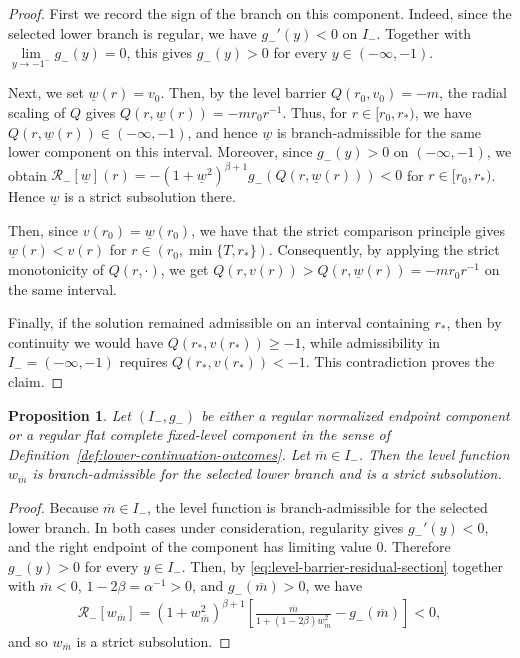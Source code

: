 \documentclass{amsart}
\theoremstyle{plain}
\newtheorem{proposition}[theorem]{Proposition}
\theoremstyle{mainintrothm}
\theoremstyle{definition}
\begin{document}
\begin{proof}
	First we record the sign of the branch on this component.  Indeed, since the selected
	lower branch is regular, we have $g_-'(y)<0$ on $I_-$.  Together with
	$\lim\limits_{y\to-1^-}g_-(y)=0$, this gives
	$g_-(y)>0$ for every $y\in(-\infty,-1)$.
	
	\medskip
	
	Next, we set $\underline w(r)=v_0$.  Then, by the level barrier $Q(r_0,v_0)=-m$, the radial scaling of
	$Q$ gives $Q(r,\underline w(r))=-mr_0r^{-1}$. Thus, for $r\in[r_0,r_*)$, we have
	$Q(r,\underline w(r))\in(-\infty,-1)$, and hence $\underline w$ is
	branch-admissible for the same lower component on this interval.  Moreover,
	since $g_-(y)>0$ on $(-\infty,-1)$, we obtain $\mathcal R_-[\underline w](r)=-(1+\underline w^2)^{\beta+1}g_-(Q(r,\underline w(r)))<0$ for $r\in[r_0,r_*)$.  Hence $\underline w$ is a strict subsolution there.
	
	\medskip
	
	Then, since  $v(r_0)=\underline w(r_0)$, we have that  the strict comparison principle gives $\underline w(r)<v(r)$ for $r\in(r_0,\min\{T,r_*\})$. Consequently, by applying the strict monotonicity of $Q(r,\cdot)$, we get
   $Q(r,v(r))>Q(r,\underline w(r))=-mr_0r^{-1}$ on the same interval.
	
	\medskip
	
	Finally, if the solution remained admissible on an interval containing
	$r_*$, then by continuity we would have $Q(r_*,v(r_*))\geq-1$, while admissibility in $I_-=(-\infty,-1)$ requires
	$Q(r_*,v(r_*))<-1$.  This contradiction proves the claim.
\end{proof}

\begin{proposition}
	\label{prop:level-barriers-signed}
	Let $(I_-,g_-)$ be either a regular normalized endpoint component or a
	regular flat complete fixed-level component in the sense of
	Definition~\ref{def:lower-continuation-outcomes}.  Let
	$\overline m\in I_-$.  Then the level function $w_{\overline m}$ is
	branch-admissible for the selected lower branch and is a strict subsolution.
\end{proposition}

\begin{proof}
	Because $\overline m\in I_-$, the level function is branch-admissible for the
	selected lower branch.  In both cases under consideration, regularity gives
	$g_-'(y)<0$, and the right endpoint of the component has limiting value
	$0$.  Therefore $g_-(y)>0$ for every $y\in I_-$.  Then, by
	\eqref{eq:level-barrier-residual-section} together with $\overline m<0$, $1-2\beta=\alpha^{-1}>0$, and
	$g_-(\overline m)>0$, we have
	\begin{align*}
		\mathcal R_-[w_{\overline m}]
		=
		(1+w_{\overline m}^2)^{\beta+1}
		\left[
		\frac{\overline m}
		{1+(1-2\beta)w_{\overline m}^2}
		-
		g_-(\overline m)
		\right]<0,
	\end{align*}
 and so $w_{\overline m}$ is a strict subsolution.
\end{proof}
\end{document}
